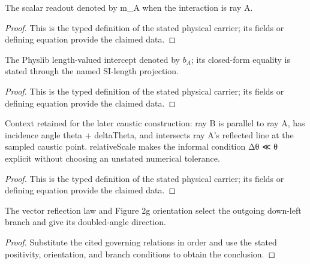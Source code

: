 \begin{definition}[Declaration mA]
  \label{def:physics:IPhO_2026_2_C_1:aux015}
  The scalar readout denoted by m\_A when the interaction is ray A.
\end{definition}
\begin{proof}
  This is the typed definition of the stated physical carrier; its fields or defining equation provide the claimed data.
\end{proof}

\begin{definition}[Declaration bA]
  \label{def:physics:IPhO_2026_2_C_1:aux016}
  The Physlib length-valued intercept denoted by \(b_A\); its closed-form
  equality is stated through the named SI-length projection.
\end{definition}
\begin{proof}
  This is the typed definition of the stated physical carrier; its fields or defining equation provide the claimed data.
\end{proof}

\begin{definition}
  \label{def:physics:IPhO_2026_2_C_1:aux017}
  Context retained for the later caustic construction: ray B is parallel to ray A, has incidence angle theta + deltaTheta, and intersects ray A's reflected line at the sampled caustic point. relativeScale makes the informal condition Δθ ≪ θ explicit without choosing an unstated numerical tolerance.
\end{definition}
\begin{proof}
  This is the typed definition of the stated physical carrier; its fields or defining equation provide the claimed data.
\end{proof}

\begin{lemma}
  \label{lem:physics:IPhO_2026_2_C_1:aux018}
  The vector reflection law and Figure 2g orientation select the outgoing down-left branch and give its doubled-angle direction.
\end{lemma}
\begin{proof}
  Substitute the cited governing relations in order and use the stated positivity, orientation, and branch conditions to obtain the conclusion.
\end{proof}


